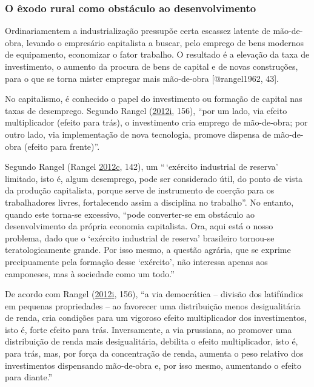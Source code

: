 \documentclass[
	12pt,				%
	oneside,			%
	a4paper,			%
	chapter=TITLE,		%
	section=TITLE,		%
	english,			%
	brazil				%
	]{abntex2}
\begin{document}
\hypertarget{o-uxeaxodo-rural-como-obstuxe1culo-ao-desenvolvimento}{%
\subsubsection{O êxodo rural como obstáculo ao desenvolvimento}\label{o-uxeaxodo-rural-como-obstuxe1culo-ao-desenvolvimento}}
\begin{citacao}
Ordinariamentem a industrialização pressupõe certa escassez latente de 
mão-de-obra, levando o empresário capitalista a buscar, pelo emprego de bens
modernos de equipamento, economizar o fator trabalho. O resultado é a elevação 
da taxa de investimento, o aumento da procura de bens de capital e de novas
construções, para o que se torna mister empregar mais mão-de-obra 
[@rangel1962, 43].
\end{citacao}
No capitalismo, é conhecido o papel do investimento ou formação de capital nas
taxas de desemprego. Segundo Rangel (\protect\hyperlink{ref-rangel1988}{2012}\protect\hyperlink{ref-rangel1988}{i}, 156), ``por um lado, via
efeito multiplicador (efeito para trás), o investimento cria emprego de
mão-de-obra; por outro lado, via implementação de nova tecnologia, promove
dispensa de mão-de-obra (efeito para frente)''.

Segundo Rangel (Rangel \protect\hyperlink{ref-rangel1986c}{2012}\protect\hyperlink{ref-rangel1986c}{c}, 142), um ``\,`exército industrial de reserva'
limitado, isto é, algum desemprego, pode ser considerado útil, do ponto de vista
da produção capitalista, porque serve de instrumento de coerção para os
trabalhadores livres, fortalecendo assim a disciplina no trabalho''. No entanto,
quando este torna-se excessivo, ``pode converter-se em obstáculo ao
desenvolvimento da própria economia capitalista. Ora, aqui está o nosso
problema, dado que o `exército industrial de reserva' brasileiro tornou-se
teratologicamente grande. Por isso mesmo, a questão agrária, que se exprime
precipuamente pela formação desse `exército', não interessa apenas aos
camponeses, mas à sociedade como um todo.''

De acordo com Rangel (\protect\hyperlink{ref-rangel1988}{2012}\protect\hyperlink{ref-rangel1988}{i}, 156), ``a via democrática -- divisão dos
latifúndios em pequenas propriedades -- ao favorecer uma distribuição menos
desigualitária de renda, cria condições para um vigoroso efeito multiplicador
dos investimentos, isto é, forte efeito para trás. Inversamente, a via
prussiana, ao promover uma distribuição de renda mais desigualitária, debilita o
efeito multiplicador, isto é, para trás, mas, por força da concentração de
renda, aumenta o peso relativo dos investimentos dispensando mão-de-obra e, por
isso mesmo, aumentando o efeito para diante.''
\end{document}
